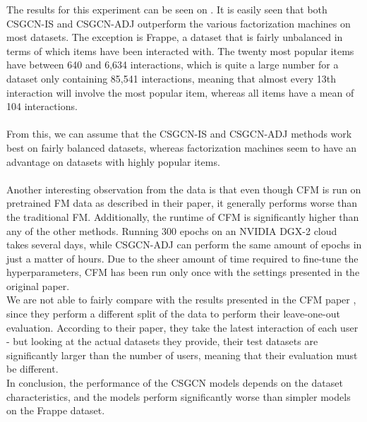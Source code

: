 The results for this experiment can be seen on .
It is easily seen that both CSGCN-IS and CSGCN-ADJ outperform the various factorization machines on most datasets.
The exception is Frappe, a dataset that is fairly unbalanced in terms of which items have been interacted with. 
The twenty most popular items have between 640 and 6,634 interactions, which is quite a large number for a dataset only containing 85,541 interactions, meaning that almost every 13th interaction will involve the most popular item, whereas all items have a mean of 104 interactions.\\\\
From this, we can assume that the CSGCN-IS and CSGCN-ADJ methods work best on fairly balanced datasets, whereas factorization machines seem to have an advantage on datasets with highly popular items.\\\\
Another interesting observation from the data is that even though CFM is run on pretrained FM data as described in their paper, it generally performs worse than the traditional FM.
Additionally, the runtime of CFM is significantly higher than any of the other methods.
Running 300 epochs on an NVIDIA DGX-2 cloud takes several days, while CSGCN-ADJ can perform the same amount of epochs in just a matter of hours.
Due to the sheer amount of time required to fine-tune the hyperparameters, CFM has been run only once with the settings presented in the original paper.\\
We are not able to fairly compare with the results presented in the CFM paper \cite{CFM}, since they perform a different split of the data to perform their leave-one-out evaluation.
According to their paper, they take the latest interaction of each user - but looking at the actual datasets they provide, their test datasets are significantly larger than the number of users, meaning that their evaluation must be different.
\\
In conclusion, the performance of the CSGCN models depends on the dataset characteristics, and the models perform significantly worse than simpler models on the Frappe dataset.

